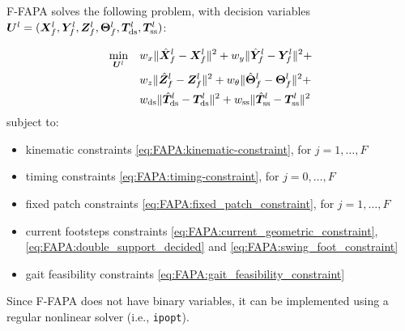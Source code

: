 \begin{sloppypar}
F-FAPA solves the following problem, with decision variables
${{\bm{U}}^l = (\bm{X}_f^l, \bm{Y}_f^l, \bm{Z}_f^l, \bm{\Theta}_f^l, \bm{T}_{\rm ds}^l, \bm{T}_{\rm ss}^l)}$:
\end{sloppypar}
\begin{braced}
    \begin{equation*}
        \begin{split}
            \min_{{\bm{U}}^l}\quad
            & w_x \| \hat{\bm{X}}_f^l - \bm{X}_f^l \|^2 + w_y \| \hat{\bm{Y}}_f^l - \bm{Y}_f^l \|^2 + \\& w_z \| \hat{\bm{Z}}_f^l - \bm{Z}_f^l \|^2 + w_{\theta} \| \hat{\bm{\Theta}}_f^l - \bm{\Theta}_f^l \|^2 + \\& w_{\rm ds} \| \hat{\bm{T}}_{\rm ds}^l - \bm{T}_{\rm ds}^l \|^2 + w_{\rm ss} \| \hat{\bm{T}}_{\rm ss}^l - \bm{T}_{\rm ss}^l \|^2
        \end{split}
    \end{equation*}
    \hspace{0.25cm} subject to:
    \begin{itemize}
        \item kinematic constraints \eqref{eq:FAPA:kinematic-constraint}, for $j=1,\dots,F$
        \item timing constraints \eqref{eq:FAPA:timing-constraint}, for $j=0,\dots,F$
        \item fixed patch constraints \eqref{eq:FAPA:fixed_patch_constraint}, for $j=1,\dots,F$
        \item current footsteps constraints \eqref{eq:FAPA:current_geometric_constraint}, \eqref{eq:FAPA:double_support_decided} and \eqref{eq:FAPA:swing_foot_constraint}
        \item gait feasibility constraints \eqref{eq:FAPA:gait_feasibility_constraint}
    \end{itemize}
\end{braced}

\medskip

Since F-FAPA does not have binary variables, it can be implemented using a
regular nonlinear solver (i.e., \texttt{ipopt}).

